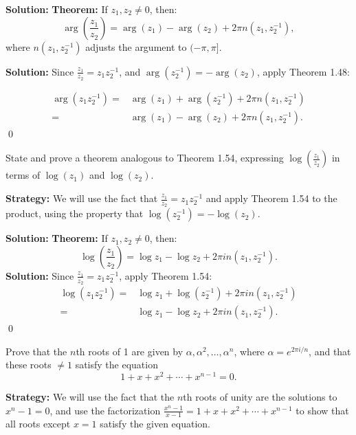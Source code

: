\bigskip\noindent\textbf{Solution:}
\textbf{Theorem:} If \( z_1, z_2 \neq 0 \), then:
\[
\arg\left( \frac{z_1}{z_2} \right) = \arg(z_1) - \arg(z_2) + 2\pi n(z_1, z_2^{-1}),
\]
where \( n(z_1, z_2^{-1}) \) adjusts the argument to \( (-\pi, \pi] \).

\bigskip\noindent\textbf{Solution:}
Since \( \frac{z_1}{z_2} = z_1 z_2^{-1} \), and \( \arg(z_2^{-1}) = -\arg(z_2) \), apply Theorem 1.48:

\begin{align*}
\arg(z_1 z_2^{-1}) =& \arg(z_1) + \arg(z_2^{-1}) + 2\pi n(z_1, z_2^{-1}) \\
=& \arg(z_1) - \arg(z_2) + 2\pi n(z_1, z_2^{-1}).
\end{align*}\qed


\begin{problembox}
State and prove a theorem analogous to Theorem 1.54, expressing \( \log\left( \frac{z_1}{z_2} \right) \) in terms of \( \log(z_1) \) and \( \log(z_2) \).
\end{problembox}

\noindent\textbf{Strategy:} We will use the fact that $\frac{z_1}{z_2} = z_1 z_2^{-1}$ and apply Theorem 1.54 to the product, using the property that $\log(z_2^{-1}) = -\log(z_2)$.

\bigskip\noindent\textbf{Solution:}
\textbf{Theorem:} If \( z_1, z_2 \neq 0 \), then:
\[
\log\left( \frac{z_1}{z_2} \right) = \log z_1 - \log z_2 + 2\pi i n(z_1, z_2^{-1}).
\]
\bigskip\noindent\textbf{Solution:}
Since \( \frac{z_1}{z_2} = z_1 z_2^{-1} \), apply Theorem 1.54:
\begin{align*}
\log(z_1 z_2^{-1}) =& \log z_1 + \log(z_2^{-1}) + 2\pi i n(z_1, z_2^{-1}) \\
=& \log z_1 - \log z_2 + 2\pi i n(z_1, z_2^{-1}).
\end{align*}\qed


\begin{problembox}
Prove that the \( n \)th roots of 1 are given by \( \alpha, \alpha^2, \ldots, \alpha^n \), where \( \alpha = e^{2\pi i/n} \), and that these roots \( \ne 1 \) satisfy the equation
\[
1 + x + x^2 + \cdots + x^{n-1} = 0.
\]
\end{problembox}

\noindent\textbf{Strategy:} We will use the fact that the $n$th roots of unity are the solutions to $x^n - 1 = 0$, and use the factorization $\frac{x^n - 1}{x - 1} = 1 + x + x^2 + \cdots + x^{n-1}$ to show that all roots except $x = 1$ satisfy the given equation.

